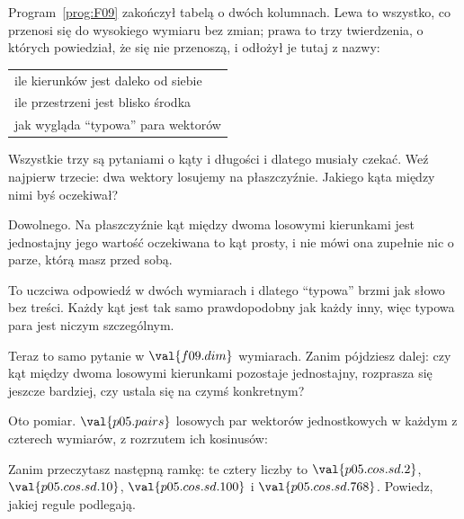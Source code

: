 \begin{fr}
Program~\ref{prog:F09} zakończył tabelą o dwóch kolumnach. Lewa to wszystko, co
przenosi się do wysokiego wymiaru bez zmian; prawa to trzy twierdzenia, o
których powiedział, że się nie przenoszą, i odłożył je tutaj z nazwy:

\begin{center}
\begin{tabularx}{\linewidth}{@{}X@{}}
\toprule
ile kierunków jest daleko od siebie \\
ile przestrzeni jest blisko środka \\
jak wygląda \enquote{typowa} para wektorów \\
\bottomrule
\end{tabularx}
\end{center}

Wszystkie trzy są pytaniami o kąty i długości i dlatego musiały czekać. Weź
najpierw trzecie: dwa wektory losujemy na płaszczyźnie. Jakiego kąta między
nimi byś oczekiwał?
\nextframe
\end{fr}

\begin{fr}
\begin{ansblock}
Dowolnego. Na płaszczyźnie kąt między dwoma losowymi kierunkami jest
jednostajny \dash{} jego wartość oczekiwana to kąt prosty, i nie mówi ona
zupełnie nic o parze, którą masz przed sobą.
\end{ansblock}

To uczciwa odpowiedź w dwóch wymiarach i dlatego \enquote{typowa} brzmi jak
słowo bez treści. Każdy kąt jest tak samo prawdopodobny jak każdy inny, więc
typowa para jest niczym szczególnym.

Teraz to samo pytanie w $\val{f09.dim}$ wymiarach. Zanim pójdziesz dalej: czy
kąt między dwoma losowymi kierunkami pozostaje jednostajny, rozprasza się
jeszcze bardziej, czy ustala się na czymś konkretnym?
\dotline
\nextframe
\end{fr}

\begin{fr}
Oto pomiar. $\val{p05.pairs}$ losowych par wektorów jednostkowych w każdym z
czterech wymiarów, z rozrzutem ich kosinusów:


Zanim przeczytasz następną ramkę: te cztery liczby to $\val{p05.cos.sd.2}$,
$\val{p05.cos.sd.10}$, $\val{p05.cos.sd.100}$ i $\val{p05.cos.sd.768}$.
Powiedz, jakiej regule podlegają.
\dotline
\nextframe
\end{fr}

